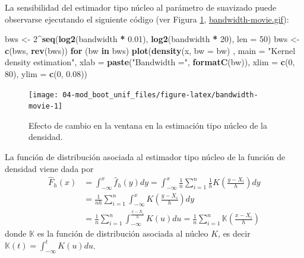 \documentclass[]{book}
\newenvironment{Shaded}{\begin{snugshade}}{\end{snugshade}}
\newcommand{\KeywordTok}[1]{\textcolor[rgb]{0.13,0.29,0.53}{\textbf{#1}}}
\newcommand{\DataTypeTok}[1]{\textcolor[rgb]{0.13,0.29,0.53}{#1}}
\newcommand{\DecValTok}[1]{\textcolor[rgb]{0.00,0.00,0.81}{#1}}
\newcommand{\FloatTok}[1]{\textcolor[rgb]{0.00,0.00,0.81}{#1}}
\newcommand{\StringTok}[1]{\textcolor[rgb]{0.31,0.60,0.02}{#1}}
\newcommand{\ControlFlowTok}[1]{\textcolor[rgb]{0.13,0.29,0.53}{\textbf{#1}}}
\newcommand{\OperatorTok}[1]{\textcolor[rgb]{0.81,0.36,0.00}{\textbf{#1}}}
\newcommand{\NormalTok}[1]{#1}
\theoremstyle{definition}
\theoremstyle{definition}
\theoremstyle{definition}
\theoremstyle{remark}
\begin{document}
La sensibilidad del estimador tipo núcleo al parámetro de suavizado
puede observarse ejecutando el siguiente código (ver Figura
\ref{fig:bandwidth-movie},
\href{./bandwidth-movie.gif}{bandwidth-movie.gif}):

\begin{Shaded}
\begin{Highlighting}[]
\NormalTok{bws <-}\StringTok{ }\DecValTok{2}\OperatorTok{^}\KeywordTok{seq}\NormalTok{(}\KeywordTok{log2}\NormalTok{(bandwidth }\OperatorTok{*}\StringTok{ }\FloatTok{0.01}\NormalTok{), }\KeywordTok{log2}\NormalTok{(bandwidth }\OperatorTok{*}\StringTok{ }\DecValTok{20}\NormalTok{), }\DataTypeTok{len =} \DecValTok{50}\NormalTok{)}
\NormalTok{bws <-}\StringTok{ }\KeywordTok{c}\NormalTok{(bws, }\KeywordTok{rev}\NormalTok{(bws))}
\ControlFlowTok{for}\NormalTok{ (bw }\ControlFlowTok{in}\NormalTok{ bws)}
  \KeywordTok{plot}\NormalTok{(}\KeywordTok{density}\NormalTok{(x, }\DataTypeTok{bw =}\NormalTok{ bw) , }\DataTypeTok{main =} \StringTok{"Kernel density estimation"}\NormalTok{, }
         \DataTypeTok{xlab =} \KeywordTok{paste}\NormalTok{(}\StringTok{"Bandwidth ="}\NormalTok{, }\KeywordTok{formatC}\NormalTok{(bw)), }
         \DataTypeTok{xlim =} \KeywordTok{c}\NormalTok{(}\DecValTok{0}\NormalTok{, }\DecValTok{80}\NormalTok{), }\DataTypeTok{ylim =} \KeywordTok{c}\NormalTok{(}\DecValTok{0}\NormalTok{, }\FloatTok{0.08}\NormalTok{))}
\end{Highlighting}
\end{Shaded}

\begin{figure}[!htb]

{\centering \texttt{[image: 04-mod\_boot\_unif\_files/figure-latex/bandwidth-movie-1]} 

}

\caption{Efecto de cambio en la ventana en la estimación tipo núcleo de la densidad.}\label{fig:bandwidth-movie}
\end{figure}

La función de distribución asociada al estimador tipo núcleo de la
función de densidad viene dada por \[\begin{aligned}
\hat{F}_{h}\left( x \right) &= \int_{-\infty }^{x}\hat{f}_{h}\left( y \right) dy
=\int_{-\infty }^{x}\frac{1}{n}\sum_{i=1}^{n}\frac{1}{h}
K\left( \frac{y-X_i}{h} \right) dy \\
&= \frac{1}{nh}\sum_{i=1}^{n}\int_{-\infty }^{x}
K\left( \frac{y-X_i}{h} \right) dy \\
&= \frac{1}{n}\sum_{i=1}^{n}\int_{-\infty }^{\frac{x-X_i}{h}}K\left( u \right) du
=\frac{1}{n}\sum_{i=1}^{n}\mathbb{K}\left( \frac{x-X_i}{h} \right)
\end{aligned}\] donde \(\mathbb{K}\) es la función de distribución
asociada al núcleo \(K\), es decir
\(\mathbb{K}\left( t \right) =\int_{-\infty }^{t}K\left( u \right) du\).
\end{document}
